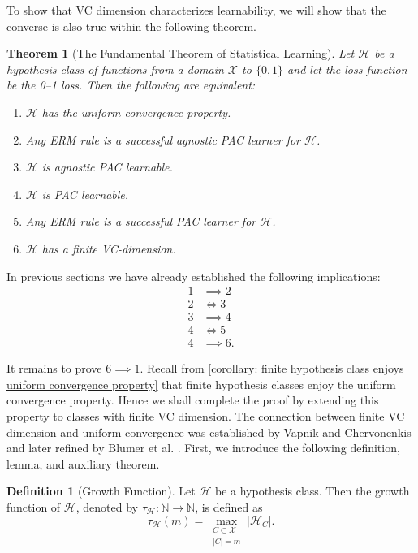 \documentclass[openany, amssymb, psamsfonts]{amsart}
\newtheorem{thm}{Theorem}[section]
\theoremstyle{definition}
\newtheorem{defn}{Definition}[section]
\numberwithin{equation}{section}
\begin{document}
To show that VC dimension characterizes learnability, we will show that the converse is also true within the following theorem.

\begin{thm}[The Fundamental Theorem of Statistical Learning] \label{theorem: fundamental theorem of statistical learning}
Let $\mathcal{H}$ be a hypothesis class of functions from a domain $\mathcal{X}$ to $\{0,1\}$ and let the loss function be the 0--1 loss. Then the following are equivalent:
\begin{enumerate}
    \item $\mathcal{H}$ has the uniform convergence property.
    \item Any ERM rule is a successful agnostic PAC learner for $\mathcal{H}$.
    \item $\mathcal{H}$ is agnostic PAC learnable.
    \item $\mathcal{H}$ is PAC learnable.
    \item Any ERM rule is a successful PAC learner for $\mathcal{H}$.
    \item $\mathcal{H}$ has a finite VC-dimension.
\end{enumerate}
\end{thm}

In previous sections we have already established the following implications:
\begin{align*}
1 &\implies 2 \\
2 &\iff  3 \\
3 &\implies 4 \\
4 &\iff  5 \\
4 &\implies 6.
\end{align*}

It remains to prove $6 \implies 1$.  Recall from \autoref{corollary: finite hypothesis class enjoys uniform convergence property} that finite hypothesis classes enjoy the uniform convergence property. Hence we shall complete the proof by extending this property to classes with finite VC dimension. The connection between finite VC dimension and uniform convergence was established by Vapnik and Chervonenkis \cite{Vapnik1971} and later refined by Blumer et al. \cite{Blumer1989}. First, we introduce the following definition, lemma, and auxiliary theorem.

\begin{defn}[Growth Function]\label{definition: growth function} Let $\mathcal{H}$ be a hypothesis class. Then the growth function of $\mathcal{H}$, denoted by $\tau_{\mathcal{H}} \colon \mathbb{N} \to \mathbb{N}$, is defined as
\[\tau_{\mathcal{H}}(m) = \max_{\substack{C \subset \mathcal{X} \\ |C| = m}} \left| \mathcal{H}_C \right|.\]
\end{defn}
\end{document}
